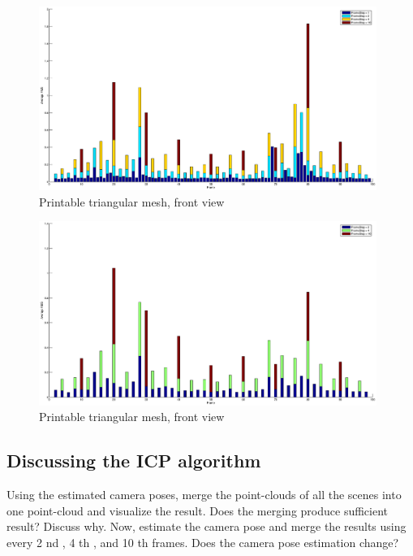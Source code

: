 \begin{figure}[ht!]
  \centering
    \includegraphics[width=0.98\textwidth]{figures/RMSunmergedKD.eps}
    \caption{Printable triangular mesh, front view}
    \label{fig:sundin-front-pcl}
\end{figure}


\begin{figure}[ht!]
  \centering
    \includegraphics[width=0.98\textwidth]{figures/RMSmergedKD.eps}
    \caption{Printable triangular mesh, front view}
    \label{fig:sundin-front-pcl}
\end{figure}

\subsection{Discussing the ICP algorithm}
Using the estimated camera poses, merge the point-clouds of all the scenes into one point-cloud and visualize the result. Does the merging produce sufficient result? Discuss why. Now, estimate the camera pose and merge the results using every 2 nd , 4 th , and 10 th frames. Does the camera pose estimation change?




